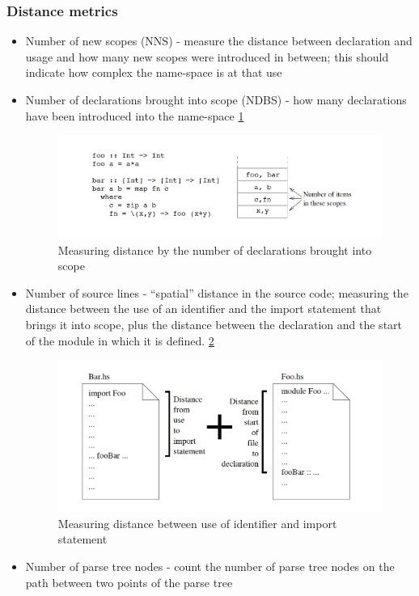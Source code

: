 \documentclass{article}
\begin{document}
\subsubsection{Distance metrics}

\begin{itemize}
\item Number of new scopes (NNS) - measure the distance between declaration and usage and how many new scopes were introduced in between; this should indicate how complex the name-space is at that use
\item Number of declarations brought into scope (NDBS) - how many declarations have been introduced into the name-space \ref{fig:scope-distance}

\begin{figure}[h!]
  \includegraphics[width=\linewidth]{scope-distance.png}
  \caption{Measuring distance by the number of declarations brought into scope \cite{eps250597}}
  \label{fig:scope-distance}
\end{figure}

\item Number of source lines - “spatial” distance in the source code; measuring the distance between the use of an identifier and the import statement that brings it into scope, plus the distance between the declaration and the start of the module in which it is defined. \ref{fig:scope-measure}

\begin{figure}[h!]
  \includegraphics[width=\linewidth]{scope-measure.png}
  \caption{Measuring distance between use of identifier and import statement \cite{eps250597}}
  \label{fig:scope-measure}
\end{figure}

\item Number of parse tree nodes - count the number of parse tree nodes on the path between two points of the parse tree

\end{itemize}
\end{document}
